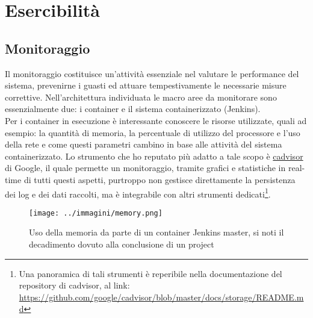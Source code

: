 
\pagestyle{IHA-fancy-style}
\chapter{Esercibilità}
\label{cap:esercibilità}


\section{Monitoraggio}

Il monitoraggio costituisce un'attività essenziale nel valutare le performance del sistema, prevenirne i guasti ed attuare tempestivamente le necessarie misure correttive. Nell'architettura individuata le macro aree da monitorare sono essenzialmente due: i \gls{container} e il sistema containerizzato (Jenkins). \\
Per i \gls{container} in esecuzione è interessante conoscere le risorse utilizzate, quali ad esempio: la quantità di memoria, la percentuale di utilizzo del processore e l'uso della rete e come questi parametri cambino in base alle attività del sistema containerizzato. Lo strumento che ho reputato più adatto a tale scopo è \hyperref[subsec:cadvisor]{cadvisor} di Google, il quale permette un monitoraggio, tramite grafici e statistiche in real-time di tutti questi aspetti, purtroppo non gestisce direttamente la persistenza dei log e dei dati raccolti, ma è integrabile con altri strumenti dedicati\footnote{Una panoramica di tali strumenti è reperibile nella documentazione del repository di cadvisor, al link: \url{https://github.com/google/cadvisor/blob/master/docs/storage/README.md}}. 

\begin{figure}[H]
    \capstart
    \centering
    \captionsetup{justification=centering}
    \texttt{[image: ../immagini/memory.png]}
    \caption[Uso della memoria da parte di un container Jenkins \gls{master}]{Uso della memoria da parte di un container Jenkins \gls{master}, si noti il decadimento dovuto alla conclusione di un \gls{project}}
\end{figure}
 
